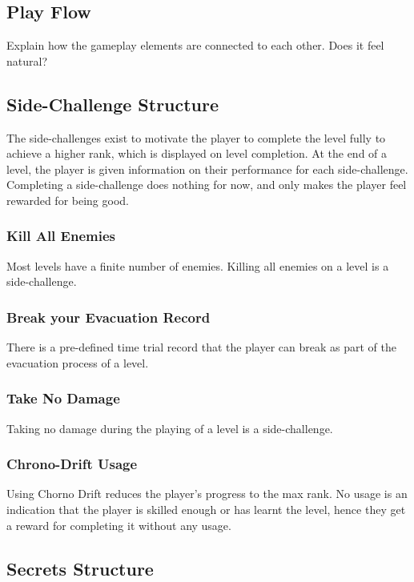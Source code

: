 \documentclass[12pt]{article}
\begin{document}
\subsection{Play Flow}

Explain how the gameplay elements are connected to each other. Does it feel natural?

\subsection{Side-Challenge Structure}

The side-challenges exist to motivate the player to complete the level fully to achieve a higher rank, which is displayed on level completion. At the end of a level, the player is given information on their performance for each side-challenge. Completing a side-challenge does nothing for now, and only makes the player feel rewarded for being good. 

\subsubsection{Kill All Enemies}

Most levels have a finite number of enemies. Killing all enemies on a level is a side-challenge.

\subsubsection{Break your Evacuation Record}

There is a pre-defined time trial record that the player can break as part of the evacuation process of a level. 

\subsubsection{Take No Damage}

Taking no damage during the playing of a level is a side-challenge. 

\subsubsection{Chrono-Drift Usage}

Using Chorno Drift reduces the player's progress to the max rank. No usage is an indication that the player is skilled enough or has learnt the level, hence they get a reward for completing it without any usage. 

\subsection{Secrets Structure}
\end{document}
